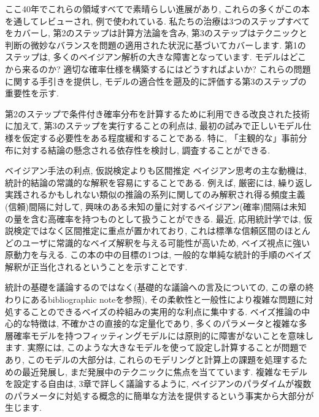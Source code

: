 \documentclass[10pt,dvipdfmx,a4]{beamer}
\begin{document}
\begin{frame}
ここ40年でこれらの領域すべてで素晴らしい進展があり, これらの多くがこの本を通してレビューされ, 例で使われている.
私たちの治療は3つのステップすべてをカバーし, 第2のステップは計算方法論を含み, 第3のステップはテクニックと判断の微妙なバランスを問題の適用された状況に基づいてカバーします.
第1のステップは, 多くのベイジアン解析の大きな障害となっています.
モデルはどこから来るのか?
適切な確率仕様を構築するにはどうすればよいか?
これらの問題に関する手引きを提供し, モデルの適合性を遡及的に評価する第3のステップの重要性を示す.

第2のステップで条件付き確率分布を計算するために利用できる改良された技術に加えて, 第3のステップを実行することの利点は, 最初の試みで正しいモデル仕様を仮定する必要性をある程度緩和することである.
特に, 「主観的な」事前分布に対する結論の懸念される依存性を検討し, 調査することができる.
\end{frame}


\begin{frame}{ベイジアン手法の利点, 仮説検定よりも区間推定}
ベイジアン思考の主な動機は, 統計的結論の常識的な解釈を容易にすることである.
例えば, 厳密には, 繰り返し実践されるかもしれない類似の推論の系列に関してのみ解釈され得る頻度主義(信頼)間隔に対して, 興味のある未知の量に対するベイジアン(確率)間隔は未知の量を含む高確率を持つものとして扱うことができる.
最近, 応用統計学では, 仮説検定ではなく区間推定に重点が置かれており, これは標準な信頼区間のほとんどのユーザに常識的なベイズ解釈を与える可能性が高いため, ベイズ視点に強い原動力を与える.
この本の中の目標の1つは, 一般的な単純な統計的手順のベイズ解釈が正当化されるということを示すことです.
\end{frame}


\begin{frame}
統計の基礎を議論するのではなく(基礎的な議論への言及についての, この章の終わりにあるbibliographic noteを参照), その柔軟性と一般性により複雑な問題に対処することのできるベイズの枠組みの実用的な利点に集中する.
ベイズ推論の中心的な特徴は, 不確かさの直接的な定量化であり, 多くのパラメータと複雑な多層確率モデルを持つフィッティングモデルには原則的に障害がないことを意味します.
実際には, このような大きなモデルを使って設定し計算することが問題であり, このモデルの大部分は, これらのモデリングと計算上の課題を処理するための最近発展し, まだ発展中のテクニックに焦点を当てています.
複雑なモデルを設定する自由は, 3章で詳しく議論するように, ベイジアンのパラダイムが複数のパラメータに対処する概念的に簡単な方法を提供するという事実から大部分が生じます.
\end{frame}
\end{document}
